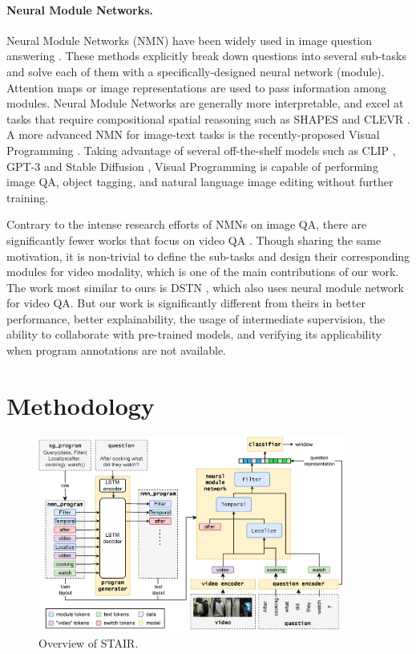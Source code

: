 \documentclass[letterpaper]{article} %
\begin{document}
\paragraph{Neural Module Networks.}
Neural Module Networks (NMN) have been widely used in image question answering \cite{Andreas2015NeuralMN,Hu2017LearningTR,Johnson2017InferringAE,Mascharka2018TransparencyBD,Hu2018ExplainableNC}. These methods explicitly break down questions into several sub-tasks and solve each of them with a specifically-designed neural network (module). Attention maps or image representations are used to pass information among modules. Neural Module Networks are generally more interpretable, and excel at tasks that require compositional spatial reasoning such as SHAPES \cite{Andreas2015NeuralMN} and CLEVR \cite{Johnson2016CLEVRAD}.
A more advanced NMN for image-text tasks is the recently-proposed Visual Programming \cite{Gupta2023VisualProgramming}.
Taking advantage of several off-the-shelf models such as CLIP \cite{Radford2021LearningTV}, GPT-3 \cite{Brown2020LanguageMA} and Stable Diffusion \cite{rombach2021highresolution}, Visual Programming is capable of performing image QA, object tagging, and natural language image editing without further training.

Contrary to the intense research efforts of NMNs on image QA, there are significantly fewer works that focus on video QA \cite{Le2022VGNMNVN, Qian2022DynamicSM}. Though sharing the same motivation, it is non-trivial to define the sub-tasks and design their corresponding modules for video modality, which is one of the main contributions of our work. The work most similar to ours is DSTN \cite{Qian2022DynamicSM}, which also uses neural module network for video QA. But our work is significantly different from theirs in better performance, better explainability, the usage of intermediate supervision, the ability to collaborate with pre-trained models, and verifying its applicability when program annotations are not available.

\section{Methodology}
\begin{figure}[t]
    \centering
    \includegraphics[width=0.9\textwidth]{plt/overview.png}
    \caption{Overview of STAIR.}
    \label{fig:overview}
\end{figure}
\end{document}

